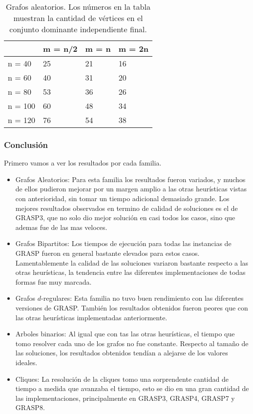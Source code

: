 \begin{table}[H]
\centering
\label{my-label}
\begin{tabular}{|l|lll|}
\hline
        & \multicolumn{1}{l|}{m = n/2} & \multicolumn{1}{l|}{m = n} & m = 2n \\ \hline
n = 40  & 25                           & 21                         & 16     \\ \cline{1-1}
n = 60  & 40                           & 31                         & 20     \\ \cline{1-1}
n = 80  & 53                           & 36                         & 26     \\ \cline{1-1}
n = 100 & 60                           & 48                         & 34     \\ \cline{1-1}
n = 120 & 76                           & 54                         & 38     \\ \hline
\end{tabular}
\caption{Grafos aleatorios. Los números en la tabla muestran la cantidad de vértices en el conjunto dominante independiente final.}
\end{table}

\subsubsection{Conclusión}

Primero vamos a ver los resultados por cada familia.

\begin{itemize}
	\item Grafos Aleatorios: Para esta familia los resultados fueron variados, y muchos de ellos pudieron mejorar por un margen amplio a las otras heurísticas vistas con anterioridad, sin tomar un tiempo adicional demasiado grande. Los mejores resultados observados en termino de calidad de soluciones es el de GRASP3, que no solo dio mejor solución en casi todos los casos, sino que ademas fue de las mas veloces.	
	\item Grafos Bipartitos: Los tiempos de ejecución para todas las instancias de GRASP fueron en general bastante elevados para estos casos. Lamentablemente la calidad de las soluciones variaron bastante respecto a las otras heurísticas, la tendencia entre las diferentes implementaciones de todas formas fue muy marcada.
	\item Grafos $d$-regulares: Esta familia no tuvo buen rendimiento con las diferentes versiones de GRASP. También los resultados obtenidos fueron peores que con las otras heurísticas implementadas anteriormente.
	\item Arboles binarios: Al igual que con tas las otras heurísticas, el tiempo que tomo resolver cada uno de los grafos no fue constante. Respecto al tamaño de las soluciones, los resultados obtenidos tendían a alejarse de los valores ideales.
	\item Cliques: La resolución de la cliques tomo una sorprendente cantidad de tiempo a medida que avanzaba el tiempo, esto se dio en una gran cantidad de las implementaciones, principalmente en GRASP3, GRASP4, GRASP7 y GRASP8.
\end{itemize}

